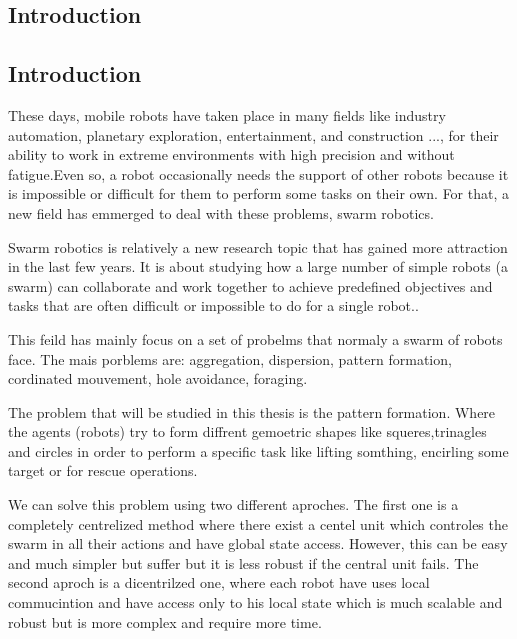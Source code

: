 \documentclass[12pt]{extarticle}
\begin{document}
\newpage
\thispagestyle{empty}
{
\hypersetup{linkcolor=false}
\tableofcontents

}
\newpage
\pagebreak
\hspace{0pt}
\vfill
\begin{center}
\section{Introduction}
\end{center}
\vfill
\hspace{0pt}
\pagebreak

\subsection{Introduction}
These days, mobile robots have taken place in many fields like industry automation, planetary exploration, entertainment, and construction ..., for their ability to work in extreme environments with high precision and without fatigue\cite{rubio2019review}.Even so, a robot occasionally needs the support of other robots because it is impossible or difficult for them to perform some tasks on their own. For that, a new field has emmerged to deal with these problems, swarm robotics.

 
Swarm robotics is relatively a new research topic that has gained more attraction in the last few years. It is about  studying how a large number of simple robots (a swarm) can collaborate and work together to achieve predefined objectives and tasks that are often difficult or impossible to do for a single robot.\cite{bayindir2016review}.

This  feild has mainly focus  on a set of probelms that normaly a swarm of robots face. The mais porblems are: aggregation, dispersion, pattern formation, cordinated mouvement, hole avoidance, foraging.

The problem that will be studied in this thesis is  the pattern formation. Where the agents (robots) try to form diffrent gemoetric shapes like squeres,trinagles and circles in order to perform a specific task like lifting somthing, encirling some target or for rescue operations.


We can solve this problem using two different aproches. The first one is a completely centrelized method where there exist a centel unit  which controles the swarm in all their actions  and have global state access. However, this can be easy and much simpler but suffer but it is less robust   if the central unit fails. The second aproch is a dicentrilzed one, where each robot have uses local commucintion and have access only to his local state which is much scalable and robust but is more complex and require more time.\cite{bayindir2007review}
\end{document}
